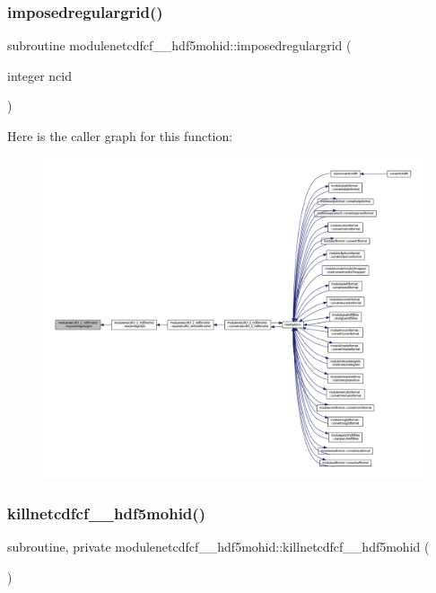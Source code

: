 \subsubsection{\texorpdfstring{imposedregulargrid()}{imposedregulargrid()}}
{\footnotesize\ttfamily subroutine modulenetcdfcf\+\_\+\_\+hdf5mohid\+::imposedregulargrid (\begin{DoxyParamCaption}\item[{integer}]{ncid }\end{DoxyParamCaption})\hspace{0.3cm}{\ttfamily [private]}}

Here is the caller graph for this function\+:\nopagebreak
\begin{figure}[H]
\begin{center}
\leavevmode
\includegraphics[width=350pt]{namespacemodulenetcdfcf__2__hdf5mohid_a9b6bf6f96a105d171c7c2487cabd5c51_icgraph}
\end{center}
\end{figure}
\mbox{\label{namespacemodulenetcdfcf__2__hdf5mohid_abe222a22b3453e9024edf051cf78ade8}} 
\subsubsection{\texorpdfstring{killnetcdfcf\+\_\+\_\+hdf5mohid()}{killnetcdfcf\_2\_hdf5mohid()}}
{\footnotesize\ttfamily subroutine, private modulenetcdfcf\+\_\+\_\+hdf5mohid\+::killnetcdfcf\+\_\+\_\+hdf5mohid (\begin{DoxyParamCaption}{ }\end{DoxyParamCaption})\hspace{0.3cm}{\ttfamily [private]}}

